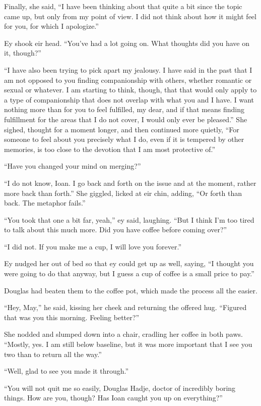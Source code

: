 Finally, she said, ``I have been thinking about that quite a bit since the topic came up, but only from my point of view. I did not think about how it might feel for you, for which I apologize.''

Ey shook eir head. ``You've had a lot going on. What thoughts did you have on it, though?''

``I have also been trying to pick apart my jealousy. I have said in the past that I am not opposed to you finding companionship with others, whether romantic or sexual or whatever. I am starting to think, though, that that would only apply to a type of companionship that does not overlap with what you and I have. I want nothing more than for you to feel fulfilled, my dear, and if that means finding fulfillment for the areas that I do not cover, I would only ever be pleased.'' She sighed, thought for a moment longer, and then continued more quietly, ``For someone to feel about you precisely what I do, even if it is tempered by other memories, is too close to the devotion that I am most protective of.''

``Have you changed your mind on merging?''

``I do not know, Ioan. I go back and forth on the issue and at the moment, rather more back than forth.'' She giggled, licked at eir chin, adding, ``Or forth than back. The metaphor fails.''

``You took that one a bit far, yeah,'' ey said, laughing. ``But I think I'm too tired to talk about this much more. Did you have coffee before coming over?''

``I did not. If you make me a cup, I will love you forever.''

Ey nudged her out of bed so that ey could get up as well, saying, ``I thought you were going to do that anyway, but I guess a cup of coffee is a small price to pay.''

Douglas had beaten them to the coffee pot, which made the process all the easier.

``Hey, May,'' he said, kissing her cheek and returning the offered hug. ``Figured that was you this morning. Feeling better?''

She nodded and slumped down into a chair, cradling her coffee in both paws. ``Mostly, yes. I am still below baseline, but it was more important that I see you two than to return all the way.''

``Well, glad to see you made it through.''

``You will not quit me so easily, Douglas Hadje, doctor of incredibly boring things. How are you, though? Has Ioan caught you up on everything?''

